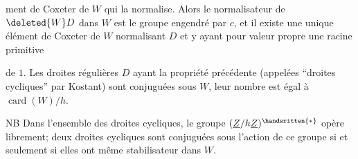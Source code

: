 ment de Coxeter de $W$ qui la normalise. Alors le normalisateur de $\deleted{W}D$ dans $W$ est le groupe engendré par $c$, et il existe une unique élément de Coxeter de $W$ normalisant $D$ et y ayant pour valeur propre une racine primitive  de $1$. Les droites régulières $D$ ayant la propriété précédente (appelées ``droites cycliques'' par Kostant) sont conjuguées sous $W$, leur nombre est égal à $\operatorname{card}(W)/h$.

NB Dans l'ensemble des droites cycliques, le groupe $(\underline{Z}/h\underline{Z})^{\handwritten{*}}$ opère librement; deux droites cycliques sont conjuguées sous l'action de ce groupe si et seulement si elles ont même stabilisateur dans $W$.
